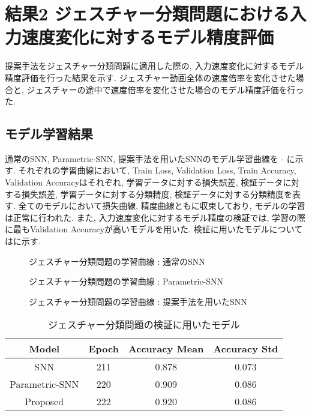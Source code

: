 \section{結果2 ジェスチャー分類問題における入力速度変化に対するモデル精度評価} \label{sec:result2}
提案手法をジェスチャー分類問題に適用した際の, 入力速度変化に対するモデル精度評価を行った結果を示す.
ジェスチャー動画全体の速度倍率を変化させた場合と, ジェスチャーの途中で速度倍率を変化させた場合のモデル精度評価を行った.

\subsection{モデル学習結果}
通常のSNN, Parametric-SNN, 提案手法を用いたSNNのモデル学習曲線を - に示す.
それぞれの学習曲線において, Train Loss, Validation Loss, Train Accuracy, Validation Accuracyはそれぞれ, 学習データに対する損失誤差, 検証データに対する損失誤差, 学習データに対する分類精度, 検証データに対する分類精度を表す.
全てのモデルにおいて損失曲線, 精度曲線ともに収束しており, モデルの学習は正常に行われた.
また, 入力速度変化に対するモデル精度の検証では, 学習の際に最もValidation Accuracyが高いモデルを用いた.
検証に用いたモデルについてはに示す.
\begin{figure}[htb]
    \centering
    
    \caption{ジェスチャー分類問題の学習曲線 : 通常のSNN}
    \label{fig:result2:1:snn}
\end{figure}
\begin{figure}[htb]
    \centering
    
    \caption{ジェスチャー分類問題の学習曲線 : Parametric-SNN}
    \label{fig:result2:1:parametric:snn}
\end{figure}
\begin{figure}[htb]
    \centering
    
    \caption{ジェスチャー分類問題の学習曲線 : 提案手法を用いたSNN}
    \label{fig:result2:1:proposed}
\end{figure}

\begin{table}[htb]
    \centering
    \caption{ジェスチャー分類問題の検証に用いたモデル}
    \label{tab:result2:model:parameter}
    \begin{tabular}{cccc}
        \hline
        \textbf{Model}& \textbf{Epoch} & \textbf{Accuracy Mean} & \textbf{Accuracy Std}\\
        \hline
        SNN &  211 & 0.878 & 0.073\\
        Parametric-SNN & 220 & 0.909 & 0.086\\
        Proposed & 222 & 0.920 & 0.086\\
        \hline
    \end{tabular}
\end{table}
\clearpage

